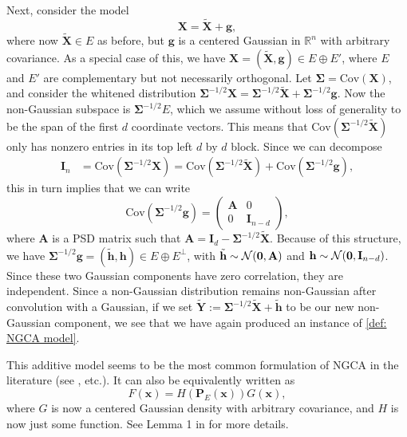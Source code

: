 \documentclass[final,12pt]{colt2018} %
\numberwithin{equation}{section}
\DeclarePairedDelimiter{\paren}{(}{)}
\newcommand{\Cov}{\text{Cov}}
\newcommand{\R}{\mathbb{R}}
\newcommand{\N}[2]{\mathcal{N}\paren*{#1,#2}}
\newcommand{\boldg}{\textbf{g}}
\newcommand{\boldA}{\textbf{A}}
\newcommand{\boldx}{\textbf{x}}
\newcommand{\boldSigma}{\boldsymbol{\Sigma}}
\newcommand{\boldP}{\textbf{P}}
\newcommand{\boldI}{\textbf{I}}
\newcommand{\boldX}{\textbf{X}}
\newcommand{\boldY}{\textbf{Y}}
\begin{document}
Next, consider the model
\begin{equation*}
\boldX = \tilde{\boldX} + \boldg,
\end{equation*}
where now $\tilde{\boldX} \in E$ as before, but $\boldg$ is a centered Gaussian in $\R^n$ with arbitrary covariance. As a special case of this, we have $\boldX = (\tilde{\boldX},\boldg) \in E\oplus E'$, where $E$ and $E'$ are complementary but not necessarily orthogonal. Let $\boldSigma = \Cov(\boldX)$, and consider the whitened distribution $\boldSigma^{-1/2}\boldX = \boldSigma^{-1/2}\tilde{\boldX} + \boldSigma^{-1/2}\boldg$. Now the non-Gaussian subspace is $\boldSigma^{-1/2}E$, which we assume without loss of generality to be the span of the first $d$ coordinate vectors. This means that $\Cov(\boldSigma^{-1/2}\tilde{\boldX})$ only has nonzero entries in its top left $d$ by $d$ block. Since we can decompose
\begin{align*}
\boldI_n & = \Cov(\boldSigma^{-1/2}\boldX) = \Cov(\boldSigma^{-1/2}\tilde{\boldX}) + \Cov(\boldSigma^{-1/2}\boldg),
\end{align*}
this in turn implies that we can write
\begin{equation*}
\Cov(\boldSigma^{-1/2}\boldg) = \left(
\begin{array}{c|c}
\boldA & 0 \\
\hline
0 & \boldI_{n-d}
\end{array}
\right),
\end{equation*}
where $\boldA$ is a PSD matrix such that $\boldA = \boldI_d - \boldSigma^{-1/2}\tilde{\boldX}$. Because of this structure, we have $\boldSigma^{-1/2}\boldg = (\tilde{\textbf{h}},\textbf{h}) \in E\oplus E^\perp$, with $\tilde{\textbf{h}} \sim \N{\textbf{0}}{\boldA}$ and $\textbf{h} \sim \N{\textbf{0}}{\boldI_{n-d}}$. Since these two Gaussian components have zero correlation, they are independent. Since a non-Gaussian distribution remains non-Gaussian after convolution with a Gaussian, if we set $\tilde{\boldY} := \boldSigma^{-1/2}\tilde{\boldX} + \tilde{\textbf{h}}$ to be our new non-Gaussian component, we see that we have again produced an instance of \eqref{def: NGCA model}.

This additive model seems to be the most common formulation of NGCA in the literature (see \cite{Blanchard2006b,Kawanabe2006}, etc.). It can also be equivalently written as
\begin{equation}
F(\boldx) = H(\boldP_E(\boldx)) G(\boldx),
\end{equation}
where $G$ is now a centered Gaussian density with arbitrary covariance, and $H$ is now just some function. See Lemma 1 in \cite{Blanchard2006b} for more details.
 
\end{document}
